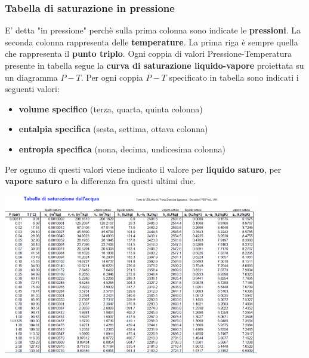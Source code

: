 \subsubsection{Tabella di saturazione in pressione}
E' detta "in pressione" perchè sulla prima colonna sono indicate le \textbf{pressioni}.\newline
La seconda colonna rappresenta delle \textbf{temperature}.\newline
\newline
La prima riga è sempre quella che rappresenta il \textbf{punto triplo}.\newline
\newline
Ogni coppia di valori Pressione-Temperatura presente in tabella segue la \textbf{curva di saturazione liquido-vapore} proiettata su un diagramma $P-T$.\newline
\newline
Per ogni coppia $P-T$ specificato in tabella sono indicati i seguenti valori:
\begin{itemize}
    \item \textbf{volume specifico} (terza, quarta, quinta colonna)
    \item \textbf{entalpia specifica} (sesta, settima, ottava colonna)
    \item \textbf{entropia specifica} (nona, decima, undicesima colonna)
\end{itemize}
Per ognuno di questi valori viene indicato il valore per \textbf{liquido saturo}, per \textbf{vapore saturo} e la differenza fra questi ultimi due.
\begin{center}
    \includegraphics[height=7cm]{../L04/img10.PNG}
\end{center}
